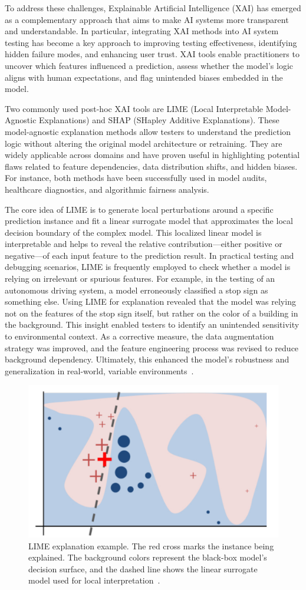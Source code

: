 \documentclass[manuscript,screen,review]{acmart}
\begin{document}
To address these challenges, Explainable Artificial Intelligence (XAI) has emerged as a complementary approach that aims to make AI systems more transparent and understandable. In particular, integrating XAI methods into AI system testing has become a key approach to improving testing effectiveness, identifying hidden failure modes, and enhancing user trust. XAI tools enable practitioners to uncover which features influenced a prediction, assess whether the model’s logic aligns with human expectations, and flag unintended biases embedded in the model.

Two commonly used post-hoc XAI tools are LIME (Local Interpretable Model-Agnostic Explanations) and SHAP (SHapley Additive Explanations). These model-agnostic explanation methods allow testers to understand the prediction logic without altering the original model architecture or retraining. They are widely applicable across domains and have proven useful in highlighting potential flaws related to feature dependencies, data distribution shifts, and hidden biases. For instance, both methods have been successfully used in model audits, healthcare diagnostics, and algorithmic fairness analysis.

The core idea of LIME is to generate local perturbations around a specific prediction instance and fit a linear surrogate model that approximates the local decision boundary of the complex model. This localized linear model is interpretable and helps to reveal the relative contribution---either positive or negative---of each input feature to the prediction result. In practical testing and debugging scenarios, LIME is frequently employed to check whether a model is relying on irrelevant or spurious features. For example, in the testing of an autonomous driving system, a model erroneously classified a stop sign as something else. Using LIME for explanation revealed that the model was relying not on the features of the stop sign itself, but rather on the color of a building in the background. This insight enabled testers to identify an unintended sensitivity to environmental context. As a corrective measure, the data augmentation strategy was improved, and the feature engineering process was revised to reduce background dependency. Ultimately, this enhanced the model’s robustness and generalization in real-world, variable environments~\cite{Ribeiro2016}.

\begin{figure}[htbp]
  \centering
  \includegraphics[width=0.5\linewidth]{picture/5.2fig1.pdf}
  \caption{LIME explanation example. The red cross marks the instance being explained. The background colors represent the black-box model’s decision surface, and the dashed line shows the linear surrogate model used for local interpretation~\cite{Ribeiro2016}.}
  \label{fig:lime}
\end{figure}
\end{document}
